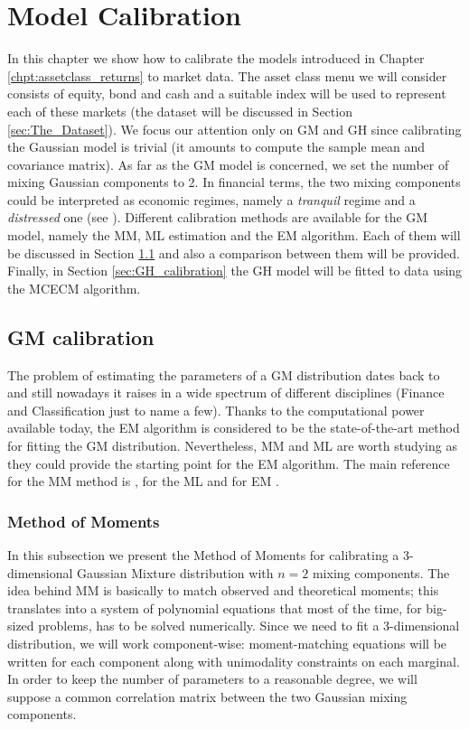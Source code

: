 \chapter{Model Calibration}\label{chpt:calibration}
In this chapter we show how to calibrate the models introduced in Chapter \ref{chpt:assetclass_returns} to market data. The asset class menu we will consider consists of equity, bond and cash and a suitable index will be used to represent each of these markets (the dataset will be discussed in Section \ref{sec:The_Dataset}). We focus our attention only on GM and GH since calibrating the Gaussian model is trivial (it amounts to compute the sample mean and covariance matrix). As far as the GM model is concerned, we set the number of mixing Gaussian components to 2. In financial terms, the two mixing components could be interpreted as economic regimes, namely a \textit{tranquil} regime and a \textit{distressed} one (see \cite{Brey2013}). Different calibration methods are available for the GM model, namely the \gls{MM}, \gls{ML} estimation  and the \gls{EM} algorithm. Each of them will be discussed in Section \ref{sec:GM_calibration} and also a comparison between them will be provided. Finally, in Section \ref{sec:GH_calibration} the \gls{GH} model will be fitted to data using the \gls{MCECM} algorithm. 
\section{GM calibration} \label{sec:GM_calibration}
The problem of estimating the parameters of a \gls{GM} distribution dates back to \cite{Pearson1894} and still nowadays it raises in a wide spectrum of different disciplines (Finance and Classification just to name a few). Thanks to the computational power available today, the \gls{EM} algorithm is considered to be the state-of-the-art method for fitting the \gls{GM} distribution. Nevertheless, \gls{MM} and \gls{ML} are worth studying as they could provide the starting point for the \gls{EM} algorithm. The main reference for the \gls{MM} method is \cite{Everitt81}, for the \gls{ML} \cite{casella2002} and for \gls{EM} \cite{McNeil2005}.
\subsection{Method of Moments}\label{subsec:MM}
In this subsection we present the Method of Moments for calibrating a 3-dimensional Gaussian Mixture distribution with $n=2$ mixing components. The idea behind MM is basically to match observed and theoretical moments; this translates into a system of polynomial equations that most of the time, for big-sized problems, has to be solved numerically. Since we need to fit a 3-dimensional distribution, we will work component-wise: moment-matching equations will be written  for each component along with unimodality constraints on each marginal. In order to keep the number of parameters to a reasonable degree, we will suppose a common correlation matrix between the two Gaussian mixing components.

